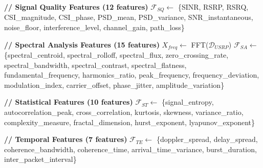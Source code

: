 \documentclass[journal]{IEEEtran}
\begin{document}
\begin{algorithm}[t]
\caption{Comprehensive Feature Extraction}
\label{alg:feature_extraction}
\begin{algorithmic}[1]

\State \textbf{// Signal Quality Features (12 features)}
\State $\mathcal{F}_{SQ} \leftarrow$ \{SINR, RSRP, RSRQ, CSI\_magnitude, CSI\_phase, 
\State \hspace{\algorithmicindent} \hspace{\algorithmicindent} PSD\_mean, PSD\_variance, SNR\_instantaneous,
\State \hspace{\algorithmicindent} \hspace{\algorithmicindent} noise\_floor, interference\_level, channel\_gain, path\_loss\}

\State \textbf{// Spectral Analysis Features (15 features)}
\State $X_{freq} \leftarrow$ FFT($\mathcal{D}_{USRP}$)
\State $\mathcal{F}_{SA} \leftarrow$ \{spectral\_centroid, spectral\_rolloff, spectral\_flux,
\State \hspace{\algorithmicindent} \hspace{\algorithmicindent} zero\_crossing\_rate, spectral\_bandwidth, spectral\_contrast,
\State \hspace{\algorithmicindent} \hspace{\algorithmicindent} spectral\_flatness, fundamental\_frequency, harmonics\_ratio,
\State \hspace{\algorithmicindent} \hspace{\algorithmicindent} peak\_frequency, frequency\_deviation, modulation\_index,
\State \hspace{\algorithmicindent} \hspace{\algorithmicindent} carrier\_offset, phase\_jitter, amplitude\_variation\}

\State \textbf{// Statistical Features (10 features)}
\State $\mathcal{F}_{ST} \leftarrow$ \{signal\_entropy, autocorrelation\_peak, cross\_correlation,
\State \hspace{\algorithmicindent} \hspace{\algorithmicindent} kurtosis, skewness, variance\_ratio, complexity\_measure,
\State \hspace{\algorithmicindent} \hspace{\algorithmicindent} fractal\_dimension, hurst\_exponent, lyapunov\_exponent\}

\State \textbf{// Temporal Features (7 features)}
\State $\mathcal{F}_{TE} \leftarrow$ \{doppler\_spread, delay\_spread, coherence\_bandwidth,
\State \hspace{\algorithmicindent} \hspace{\algorithmicindent} coherence\_time, arrival\_time\_variance, burst\_duration,
\State \hspace{\algorithmicindent} \hspace{\algorithmicindent} inter\_packet\_interval\}


\end{algorithmic}
\end{algorithm}
\end{document}
